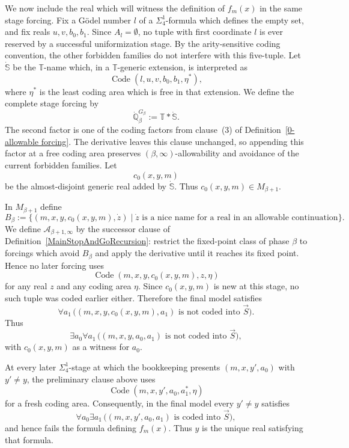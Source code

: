 \documentclass[a4paper,11pt]{article}
\newcommand{\forceQ}{\mathbb{Q}}
\begin{document}
We now include the real which will witness the definition of $f_m(x)$ in the same stage forcing. Fix a G\"odel number $l$ of a $\Sigma^1_4$-formula which defines the empty set, and fix reals $u,v,b_0,b_1$. Since $A_l=\emptyset$, no tuple with first coordinate $l$ is ever reserved by a successful uniformization stage. By the arity-sensitive coding convention, the other forbidden families do not interfere with this five-tuple. Let $\dot{\mathbb S}$ be the $\mathbb T$-name which, in a $\mathbb T$-generic extension, is interpreted as
\[
\operatorname{Code}(l,u,v,b_0,b_1,\eta^*),
\]
where $\eta^*$ is the least coding area which is free in that extension. We define the complete stage forcing by
\[
\dot{\forceQ}_\beta^{G_\beta}:=\mathbb T*\dot{\mathbb S}.
\]
The second factor is one of the coding factors from clause~(3) of Definition~\ref{0-allowable forcing}. The derivative leaves this clause unchanged, so appending this factor at a free coding area preserves $(\beta,\infty)$-allowability and avoidance of the current forbidden families. Let
\[
c_0(x,y,m)
\]
be the almost-disjoint generic real added by $\dot{\mathbb S}$. Thus $c_0(x,y,m)\in M_{\beta+1}$.

In $M_{\beta+1}$ define
\[
B_\beta:=\{(m,x,y,c_0(x,y,m),\dot z)\mid
\dot z\text{ is a nice name for a real in an allowable continuation}\}.
\]
We define $\mathcal A_{\beta+1,\infty}$ by the successor clause of Definition~\ref{MainStopAndGoRecursion}: restrict the fixed-point class of phase $\beta$ to forcings which avoid $B_\beta$ and apply the derivative until it reaches its fixed point. Hence no later forcing uses
\[
\operatorname{Code}(m,x,y,c_0(x,y,m),z,\eta)
\]
for any real $z$ and any coding area $\eta$. Since $c_0(x,y,m)$ is new at this stage, no such tuple was coded earlier either. Therefore the final model satisfies
\[
\forall a_1\,
\bigl((m,x,y,c_0(x,y,m),a_1)\text{ is not coded into }\vec S\bigr).
\]
Thus
\[
\exists a_0\forall a_1\,
\bigl((m,x,y,a_0,a_1)\text{ is not coded into }\vec S\bigr),
\]
with $c_0(x,y,m)$ as a witness for $a_0$.

At every later $\Sigma^1_4$-stage at which the bookkeeping presents $(m,x,y',a_0)$ with $y'\neq y$, the preliminary clause above uses
\[
\operatorname{Code}(m,x,y',a_0,a_1^*,\eta)
\]
for a fresh coding area. Consequently, in the final model every $y'\neq y$ satisfies
\[
\forall a_0\exists a_1\,
\bigl((m,x,y',a_0,a_1)\text{ is coded into }\vec S\bigr),
\]
and hence fails the formula defining $f_m(x)$. Thus $y$ is the unique real satisfying that formula.
\end{document}
